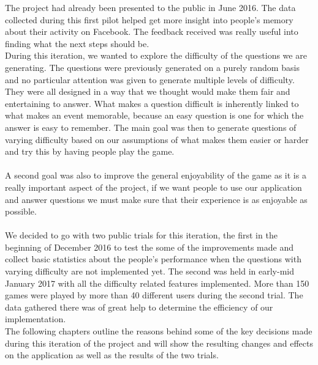 The project had already been presented to the public in June 2016. The data collected during this first pilot helped get more insight into people's memory about their activity on Facebook. The feedback received was really useful into finding what the next steps should be.\\
During this iteration, we wanted to explore the difficulty of the questions we are generating. The questions were previously generated on a purely random basis and no particular attention was given to generate multiple levels of difficulty. They were all designed in a way that we thought would make them fair and entertaining to answer. What makes a question difficult is inherently linked to what makes an event memorable, because an easy question is one for which the answer is easy to remember. The main goal was then to generate questions of varying difficulty based on our assumptions of what makes them easier or harder and try this by having people play the game.\\\\
A second goal was also to improve the general enjoyability of the game as it is a really important aspect of the project, if we want people to use our application and answer questions we must make sure that their experience is as enjoyable as possible.\\\\
We decided to go with two public trials for this iteration, the first in the beginning of December 2016 to test the some of the improvements made and collect basic statistics about the people's performance when the questions with varying difficulty are not implemented yet. The second was held in early-mid January 2017 with all the difficulty related features implemented. More than 150 games were played by more than 40 different users during the second trial. The data gathered there was of great help to determine the efficiency of our implementation.\\
The following chapters outline the reasons behind some of the key decisions made during this iteration of the project and will show the resulting changes and effects on the application as well as the results of the two trials.